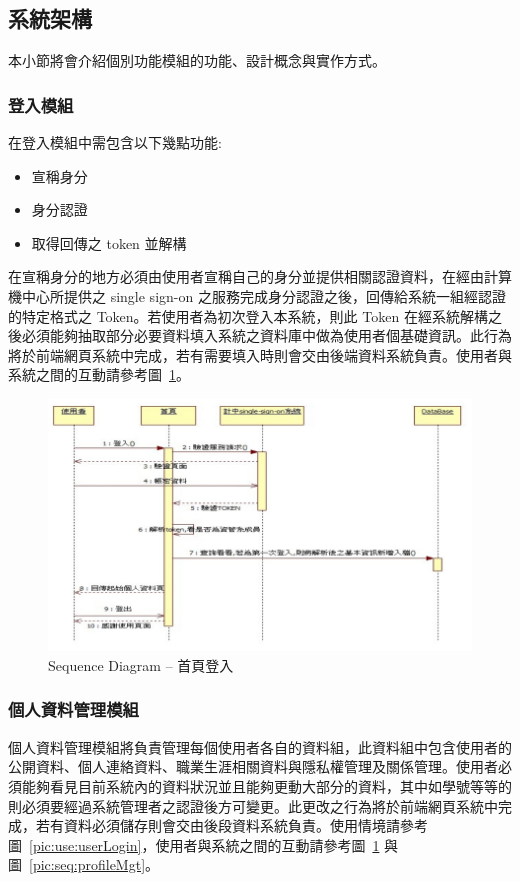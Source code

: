 \subsection{系統架構}

本小節將會介紹個別功能模組的功能、設計概念與實作方式。

\subsubsection{登入模組}
在登入模組中需包含以下幾點功能: 
\begin{itemize}
\item{宣稱身分}
\item{身分認證}
\item{取得回傳之 token 並解構}
\end{itemize}
在宣稱身分的地方必須由使用者宣稱自己的身分並提供相關認證資料，在經由計算機中心所提供之 single sign-on 之服務完成身分認證之後，回傳給系統一組經認證的特定格式之 Token。若使用者為初次登入本系統，則此 Token 在經系統解構之後必須能夠抽取部分必要資料填入系統之資料庫中做為使用者個基礎資訊。此行為將於前端網頁系統中完成，若有需要填入時則會交由後端資料系統負責。使用者與系統之間的互動請參考圖~\ref{pic:seq:login}。

\begin{figure}[h]
\centering
\includegraphics[width=\textwidth]{img/seq01.png}
\caption{Sequence Diagram -- 首頁登入}
\label{pic:seq:login}
\end{figure}

\subsubsection{個人資料管理模組}
\label{sssec:userprofile}
個人資料管理模組將負責管理每個使用者各自的資料組，此資料組中包含使用者的公開資料、個人連絡資料、職業生涯相關資料與隱私權管理及關係管理。使用者必須能夠看見目前系統內的資料狀況並且能夠更動大部分的資料，其中如學號等等的則必須要經過系統管理者之認證後方可變更。此更改之行為將於前端網頁系統中完成，若有資料必須儲存則會交由後段資料系統負責。使用情境請參考圖~\ref{pic:use:userLogin}，使用者與系統之間的互動請參考圖~\ref{pic:seq:login} 與圖~\ref{pic:seq:profileMgt}。

